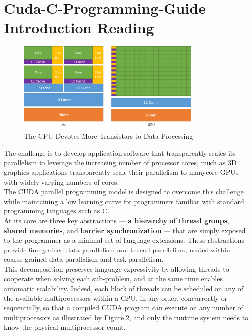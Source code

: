 \documentclass[11pt]{ctexart}
\begin{document}
\section{Cuda-C-Programming-Guide Introduction Reading}
\begin{figure}[h]
    \centering
    \includegraphics[width=0.8\textwidth]{photos/TheGPUDevotesMoreTransistorstoDataProcessing.png}
    \caption{The GPU Devotes More Transistors to Data Processing}
    \label{fig:1}
\end{figure}

The challenge is to develop application software that transparently scales its parallelism to leverage the increasing number of processor cores, much as 3D graphics applications transparently scale their parallelism to manycore GPUs with widely varying numbers of cores.\\

The CUDA parallel programming model is designed to overcome this challenge while maintaining a low learning curve for programmers familiar with standard programming languages such as C.\\

At its core are three key abstractions — \textbf{a hierarchy of thread groups}, \textbf{shared memories}, and \textbf{barrier synchronization} — that are simply exposed to the programmer as a minimal set of language extensions.
These abstractions provide fine-grained data parallelism and thread parallelism, nested within coarse-grained data parallelism and task parallelism. \\

This decomposition preserves language expressivity by allowing threads to cooperate when solving each sub-problem, and at the same time enables automatic scalability. Indeed, each block of threads can be scheduled on any of the available multiprocessors within a GPU, in any order, concurrently or sequentially, so that a compiled CUDA program can execute on any number of multiprocessors as illustrated by Figure 2, and only the runtime system needs to know the physical multiprocessor count.
\end{document}
